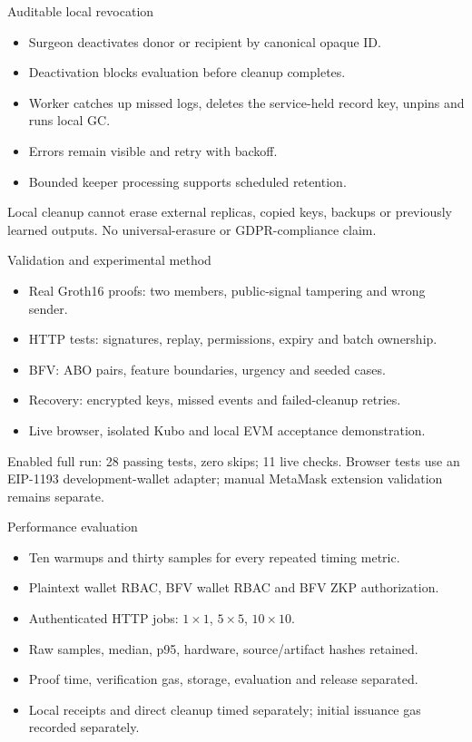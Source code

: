 \documentclass[10pt]{beamer}
\begin{document}
\begin{frame}{Auditable local revocation}
\begin{itemize}
\item Surgeon deactivates donor or recipient by canonical opaque ID.
\item Deactivation blocks evaluation before cleanup completes.
\item Worker catches up missed logs, deletes the service-held record key, unpins and runs local GC.
\item Errors remain visible and retry with backoff.
\item Bounded keeper processing supports scheduled retention.
\end{itemize}
Local cleanup cannot erase external replicas, copied keys, backups or previously learned outputs. No universal-erasure or GDPR-compliance claim.
\end{frame}
\begin{frame}{Validation and experimental method}
\begin{itemize}
\item Real Groth16 proofs: two members, public-signal tampering and wrong sender.
\item HTTP tests: signatures, replay, permissions, expiry and batch ownership.
\item BFV: ABO pairs, feature boundaries, urgency and seeded cases.
\item Recovery: encrypted keys, missed events and failed-cleanup retries.
\item Live browser, isolated Kubo and local EVM acceptance demonstration.
\end{itemize}
Enabled full run: 28 passing tests, zero skips; 11 live checks. Browser tests use an EIP-1193 development-wallet adapter; manual MetaMask extension validation remains separate.
\end{frame}
\begin{frame}{Performance evaluation}
\begin{itemize}
\item Ten warmups and thirty samples for every repeated timing metric.
\item Plaintext wallet RBAC, BFV wallet RBAC and BFV ZKP authorization.
\item Authenticated HTTP jobs: $1\times1$, $5\times5$, $10\times10$.
\item Raw samples, median, p95, hardware, source/artifact hashes retained.
\item Proof time, verification gas, storage, evaluation and release separated.
\item Local receipts and direct cleanup timed separately; initial issuance gas recorded separately.
\end{itemize}
\end{frame}
\end{document}
